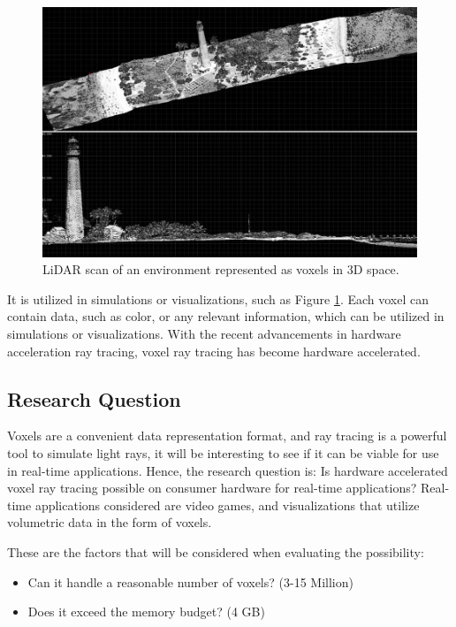 \documentclass[12pt]{article}
\begin{document}
\begin{figure}[H]
    \begin{center}
        \includegraphics[scale=0.4]{LiDAR}
    \end{center}
    \caption{LiDAR scan of an environment represented as voxels in 3D space. \parencite{NOS:LiDAR}}
    \label{fig:LiDAR}
\end{figure}

It is utilized in simulations or visualizations, such as Figure \ref{fig:LiDAR}.
Each voxel can contain data, such as color, or any relevant information,
which can be utilized in simulations or visualizations. With the recent advancements in hardware acceleration
ray tracing, voxel ray tracing has become hardware accelerated. \parencite[Chapter~37]{NVIDIA:RTGems2}

\subsection{Research Question}

Voxels are a convenient data representation format, and ray tracing is a powerful tool to simulate light rays,
it will be interesting to see if it can be viable for use in real-time applications.
Hence, the research question is: Is hardware accelerated voxel ray tracing possible on consumer hardware for real-time applications?
Real-time applications considered are video games, and visualizations that utilize volumetric data in the form of voxels.

These are the factors that will be considered when evaluating the possibility:
\begin{itemize}
    \itemsep0em
    \item Can it handle a reasonable number of voxels? (3-15 Million)
    \item Does it exceed the memory budget? (4 GB)
\end{itemize}
\end{document}
